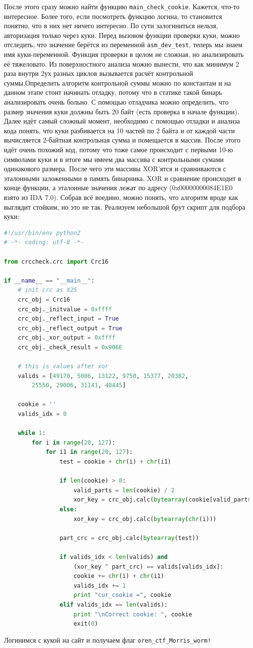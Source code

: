 \documentclass[idxtotoc,hyperref,openany,oneside]{files/reverse} %
\begin{document}
После этого сразу можно найти функцию \verb|main_check_cookie|. Кажется, что-то интересное. Более того, если посмотреть функцию логина, то становится понятно, что в них нет ничего интересно. По сути залогиниться нельзя, авторизация только через куки. Перед вызовом функции проверки куки, можно отследить, что значение берётся из переменной \verb|asm_dev_test|, теперь мы знаем имя куки-переменной. Функция проверки в целом не сложная, но анализировать её тяжеловато. Из поверхностного анализа можно вынести, что как минимум 2 раза внутри 2ух разных циклов вызывается расчёт контрольной суммы.Определить алгоритм контрольной суммы можно по константам и на данном этапе стоит начинать отладку, потому что в статике такой бинарь анализировать очень больно. С помощью отладчика можно определить, что размер значения куки должны быть 20 байт (есть проверка в начале функции). Далее идёт самый сложный момент, необходимо с помощью отладки и анализа кода понять, что куки разбивается на 10 частей по 2 байта и от каждой части вычисляется 2-байтная контрольная сумма и помещается в массив. После этого идёт очень похожий код, потому что тоже самое происходит с первыми 10-ю символами куки и в итоге мы имеем два массива с контрольными сумами одинакового размера. После чего эти массивы XOR'ятся и сравниваются с эталонными заложенными в память бинарника.
XOR и сравнение происходит в конце функции, а эталонные значения лежат по адресу (0x00000000084E1E0 взято из IDA 7.0). Собрав всё воедино, можно понять, что алгоритм вроде как выглядит стойким, но это не так. Реализуем небольшой брут скрипт для подбора куки:
\begin{lstlisting}[language=Python, caption=Брут куки]
#!/usr/bin/env python2
# -*- coding: utf-8 -*-

from crccheck.crc import Crc16

if __name__ == "__main__":
	# init crc as X25
    crc_obj = Crc16
    crc_obj._initvalue = 0xffff
    crc_obj._reflect_input = True
    crc_obj._reflect_output = True
    crc_obj._xor_output = 0xffff
    crc_obj._check_result = 0x906E

	# this is values after xor
    valids = [49170, 5086, 13122, 9750, 15377, 20382, 
    	25550, 29006, 31141, 40445]

    cookie = ''
    valids_idx = 0

    while 1:
        for i in range(20, 127):
            for i1 in range(20, 127):
                test = cookie + chr(i) + chr(i1)

                if len(cookie) > 0:
                    valid_parts = len(cookie) / 2
                    xor_key = crc_obj.calc(bytearray(cookie[valid_parts]))
                else:
                    xor_key = crc_obj.calc(bytearray(chr(i)))

                part_crc = crc_obj.calc(bytearray(test))

                if valids_idx < len(valids) and 
                	(xor_key ^ part_crc) == valids[valids_idx]:
                    cookie += chr(i) + chr(i1)
                    valids_idx += 1
                    print "cur_cookie =", cookie
                elif valids_idx == len(valids):
                    print "\nCorrect cookie: ", cookie
                    exit(0)
\end{lstlisting}

Логинимся с кукой на сайт и получаем флаг \verb|oren_ctf_Morris_worm!|

\end{document}
